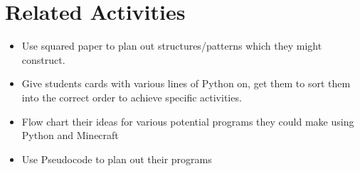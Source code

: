 \documentclass{geocraft-lesson-plan}
\begin{document}
\section*{Related Activities}
\begin{itemize}
\item Use squared paper to plan out structures/patterns which they might construct.
\item Give students cards with various lines of Python on, get them to sort them into the correct order to achieve
  specific activities.
\item Flow chart their ideas for various potential programs they could make using Python and Minecraft
\item Use Pseudocode to plan out their programs
\end{itemize}
\end{document}
